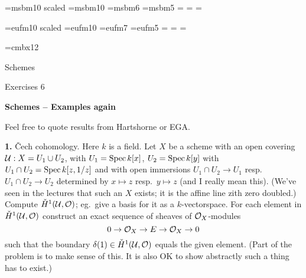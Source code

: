 \bye
\nopagenumbers

\font\gbbb=msbm10 scaled 
\font\bbbf=msbm10 
\font\sbbb=msbm6 
\font\ssbbb=msbm5 
=\bbbf
{}=\sbbb 
{}=\ssbbb 
\def\bbb{\fam6}
\def\mP{{\bbb P}} 
\def\mA{{\bbb A}} 
\def\mB{{\bbb B}} 
\def\mR{{\bbb R}}
\def\mZ{{\bbb Z}}

\font\ggothic=eufm10 scaled 
\font\gothicf=eufm10
\font\sgothic=eufm7
\font\ssgothic=eufm5
=\gothicf
{}=\sgothic
{}=\ssgothic
\def\gothic{\fam5}


\font\Kopfont=cmbx12
\def\mapright#1{\smash{\mathop{\longrightarrow}\limits^{#1}}}
\def\mapdown#1{\Big\downarrow\rlap{$\vcenter{\hbox{$\scriptstyle#1$}}$}}
\def\downmap#1{\downarrow\rlap{$\vcenter{\hbox{$\scriptstyle#1$}}$}}
\def\mapup#1{\Big\uparrow\rlap{$\vcenter{\hbox{$\scriptstyle#1$}}$}}
\def\longlongrightarrow{\relbar \joinrel \longrightarrow}
\def\cC{{\cal C}}
\def\cD{{\cal D}}
\def\gp{{\gothic p}}
\def\gq{{\gothic q}}
\def\Spec{\mathop{\rm Spec}}
\def\Proj{\mathop{\rm Proj}}

\centerline{\Kopfont Schemes}

\smallskip
\centerline{Exercises 6}

\bigskip\noindent
{\bf Schemes -- Examples again}

\bigskip\noindent
Feel free to quote results from Hartshorne or EGA.

\bigskip\item{\bf 1.} {\v C}ech cohomology. Here $k$ is a field.
 Let $X$ be a scheme with an open covering
${\cal U} : X = U_1 \cup U_2$, with $U_1 = \Spec k[x]$, $U_2= \Spec k[y]$
with $U_1 \cap U_2 = \Spec k[z,1/z]$ and with open immersions
$U_1 \cap U_2 \to U_1$ resp.\ $U_1 \cap U_2 \to U_2$ determined
by $x \mapsto z$ resp.\ $y \mapsto z$ (and I really mean this).
(We've seen in the lectures that such an $X$ exists; it is the affine
line zith zero doubled.) Compute ${\mathaccent 20 H}^1({\cal U}, {\cal O})$;
eg.\ give a basis for it as a $k$-vectorspace.
 For each element in
${\mathaccent 20 H}^1({\cal U}, {\cal O})$
construct an exact sequence of sheaves of ${\cal O}_X$-modules
$$
0 \to {\cal O}_X \to E \to {\cal O}_X \to 0
$$ 
such that the boundary $\delta(1) \in {\mathaccent 20 H}^1({\cal U}, {\cal O})$
equals the given element. (Part of the problem is to make sense of this. 
It is also OK to show abstractly such a thing has to exist.)

